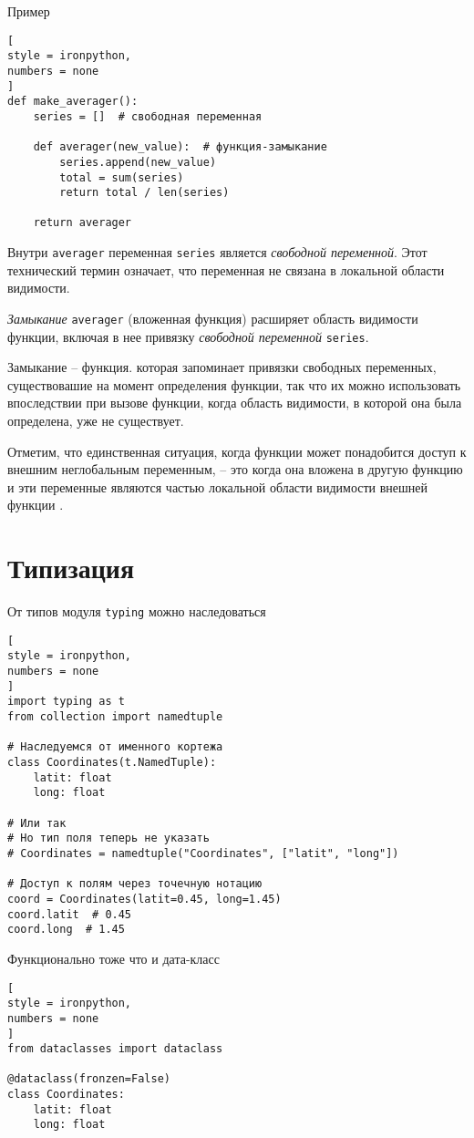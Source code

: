 \documentclass[%
	11pt,
	a4paper,
	utf8,
		]{article}
\begin{document}
Пример
\begin{lstlisting}[
style = ironpython,
numbers = none
]
def make_averager():
    series = []  # свободная переменная
    
    def averager(new_value):  # функция-замыкание
        series.append(new_value)
        total = sum(series)
        return total / len(series)
    
    return averager
\end{lstlisting}

Внутри \verb*|averager| переменная \verb*|series| является \emph{свободной переменной}. Этот технический термин означает, что переменная не связана в локальной области видимости.

{\color{blue}\emph{Замыкание} \verb*|averager| (вложенная функция)} расширяет область видимости функции, включая в нее привязку \emph{свободной переменной} \verb*|series|.

Замыкание -- функция. которая запоминает привязки свободных переменных, существовашие на момент определения функции, так что их можно использовать впоследствии при вызове функции, когда область видимости, в которой она была определена, уже не существует.

Отметим, что единственная ситуация, когда функции может понадобится доступ к внешним неглобальным переменным, -- это когда она вложена в другую функцию и эти переменные являются частью локальной области видимости внешней функции \cite[]{ramalho:python-2022}.




\section{Типизация}

От типов модуля \texttt{typing} можно наследоваться
\begin{lstlisting}[
style = ironpython,
numbers = none	
]
import typing as t
from collection import namedtuple

# Наследуемся от именного кортежа
class Coordinates(t.NamedTuple):
    latit: float
    long: float
    
# Или так
# Но тип поля теперь не указать
# Coordinates = namedtuple("Coordinates", ["latit", "long"])

# Доступ к полям через точечную нотацию
coord = Coordinates(latit=0.45, long=1.45)
coord.latit  # 0.45
coord.long  # 1.45
\end{lstlisting}

Функционально тоже что и дата-класс
\begin{lstlisting}[
style = ironpython,
numbers = none
]
from dataclasses import dataclass

@dataclass(fronzen=False)
class Coordinates:
    latit: float
    long: float
\end{lstlisting}
\end{document}
